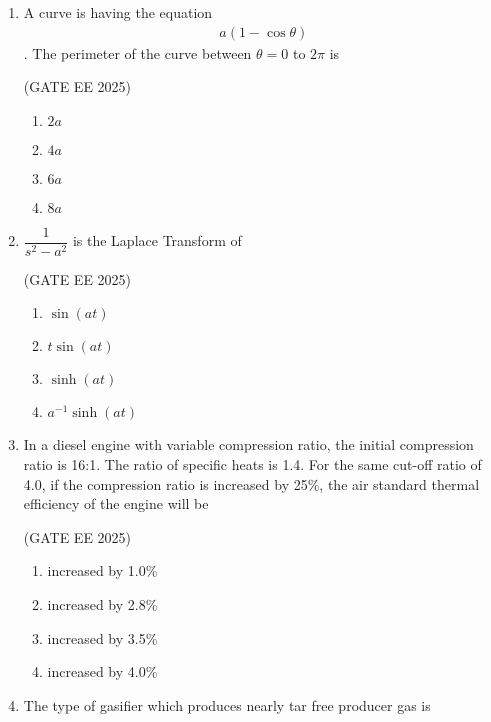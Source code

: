 \documentclass[journal,12pt,onecolumn]{IEEEtran}
\theoremstyle{remark}
\begin{document}
\begin{enumerate}
\item A curve is having the equation \begin{align*}
   a(1-\cos\theta) 
\end{align*}. The perimeter of the curve between $\theta=0$ to $2\pi$ is

\hfill(GATE EE 2025)

\begin{multicols}{4}
\begin{enumerate}
\item $2a$  
\item $4a$  
\item $6a$  
\item $8a$  
\end{enumerate}
\end{multicols}

\item $\dfrac{1}{s^2-a^2}$ is the Laplace Transform of  

\hfill(GATE EE 2025)

\begin{multicols}{4}
\begin{enumerate}
\item $\sin(at)$  
\item $t \sin(at)$  
\item $\sinh(at)$  
\item $a^{-1}\sinh(at)$  
\end{enumerate}
\end{multicols}
\newpage
\item In a diesel engine with variable compression ratio, the initial compression ratio is 16:1. The ratio of specific heats is 1.4. For the same cut-off ratio of 4.0, if the compression ratio is increased by 25\%, the air standard thermal efficiency of the engine will be

\hfill(GATE EE 2025)

\begin{multicols}{2}
\begin{enumerate}
\item increased by 1.0\%  
\item increased by 2.8\%  
\item increased by 3.5\%  
\item increased by 4.0\%  
\end{enumerate}
\end{multicols}

\item The type of gasifier which produces nearly tar free producer gas is


\end{enumerate}
\end{document}
